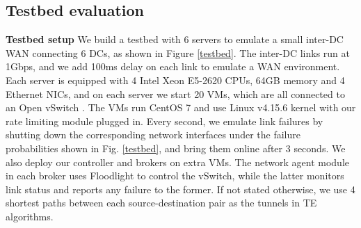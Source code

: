 \documentclass[sigconf]{acmart}
\begin{document}
%  
%



\subsection{Testbed evaluation}\label{testbed-evaluation}
\textbf{Testbed setup}
We build a testbed with 6 servers to emulate a small inter-DC WAN connecting 6 DCs, as shown in Figure \ref{testbed}. 
The inter-DC links run at 1Gbps, and we add 100ms delay on each link to emulate a WAN environment.
Each server is equipped with 4 Intel Xeon E5-2620 CPUs, 64GB memory and 4 Ethernet NICs, 
and on each server we start 20 VMs, which are all connected to an Open vSwitch \cite{openvswitch}.
The VMs run CentOS 7 and use Linux v4.15.6 kernel \cite{Kermel} with our rate limiting module plugged in. 
Every second, we emulate link failures by shutting down the corresponding network interfaces 
under the failure probabilities shown in Fig. \ref{testbed}, 
and bring them online after 3 seconds. 
We also deploy our controller and brokers on extra VMs. 
The network agent module in each broker uses Floodlight \cite{floodlight} to control the vSwitch, 
while the latter monitors link status and reports any failure to the former.
If not stated otherwise, we use 4 shortest paths between each source-destination pair as the tunnels in TE algorithms.




\end{document}
